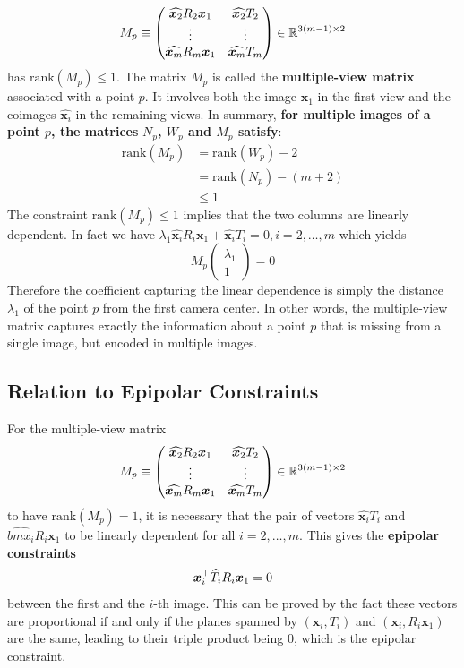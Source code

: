 \[
	M_p \equiv \begin{pmatrix}
		\widehat{\bm{x}_2} R_2 \bm{x}_1
			& \widehat{\bm{x}_2} T_2 \\
		\vdots & \vdots \\
		\widehat{\bm{x}_m} R_m \bm{x}_1
			& \widehat{\bm{x}_m} T_m
	\end{pmatrix}
	\in \mathbb{R}^{3(m-1) \times{} 2}
\]
has $\text{rank}(M_p) \leq 1$.
The matrix $M_p$ is called the \textbf{multiple-view matrix} associated
with a point $p$. It involves both the image $\bm{x}_1$ in the first view
and the coimages $\widehat{\bm{x}_i}$ in the remaining views.
In summary, \textbf{for multiple images of a point $p$, the matrices}
\textbf{$N_p$, $W_p$ and $M_p$ satisfy}:
\[
	\boxed{ \begin{array}{rl}
		\text{rank}(M_p)
		& = \text{rank}(W_p) - 2 \\
		& = \text{rank}(N_p) - (m + 2) \\
		& \leq 1
	\end{array}}
\]
The constraint $\text{rank}(M_p) \leq 1$ implies that the two columns
are linearly dependent. In fact we have
$\lambda_1 \widehat{\bm{x}_i} R_i \bm{x}_1 + \widehat{\bm{x}_i} T_i = 0,
i = 2, \ldots, m$ which yields
\[
	M_p \begin{pmatrix} \lambda_1 \\ 1 \end{pmatrix} = 0
\]
Therefore the coefficient capturing the linear dependence
is simply the distance $\lambda_1$ of the point $p$ from the first camera center.
In other words, the multiple-view matrix captures exactly the information
about a point $p$ that is missing from a single image, but encoded in multiple images.


\subsection{Relation to Epipolar Constraints}%
\label{sub:relation_to_epipolar_constraints}


For the multiple-view matrix
\[
	M_p \equiv \begin{pmatrix}
		\widehat{\bm{x}_2} R_2 \bm{x}_1
			& \widehat{\bm{x}_2} T_2 \\
		\vdots & \vdots \\
		\widehat{\bm{x}_m} R_m \bm{x}_1
			& \widehat{\bm{x}_m} T_m
	\end{pmatrix}
	\in \mathbb{R}^{3(m-1) \times{} 2}
\]
to have $\text{rank}(M_p) = 1$, it is necessary that the pair of vectors
$\widehat{\bm{x}_i} T_i$ and $\widehat{bm{x}_i} R_i \bm{x}_1$ to be
linearly dependent for all $i = 2, \ldots, m$.
This gives the \textbf{epipolar constraints}
\[
	\bm{x}_i^{\top} \widehat{T_i} R_i \bm{x}_1 = 0
\]
between the first and the $i$-th image.
This can be proved by the fact these vectors are proportional if and only if
the planes spanned by $(\bm{x}_i, T_i)$ and $(\bm{x}_i, R_i \bm{x}_1)$ are the same,
leading to their triple product being $0$, which is the epipolar constraint.\\

